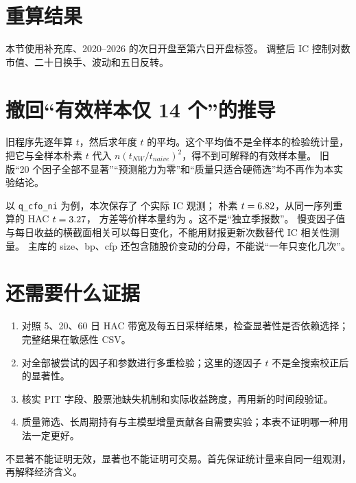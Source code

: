 \section{重算结果}
本节使用补充库、2020--2026 的次日开盘至第六日开盘标签。
调整后 IC 控制对数市值、二十日换手、波动和五日反转。



\section{撤回“有效样本仅 14 个”的推导}
旧程序先逐年算 $t$，然后求年度 $t$ 的平均。这个平均值不是全样本的检验统计量，
把它与全样本朴素 $t$ 代入 $n(t_{NW}/t_{naive})^2$，得不到可解释的有效样本量。
旧版“20 个因子全部不显著”“预测能力为零”和“质量只适合硬筛选”均不再作为本实验结论。

以 \texttt{q\_cfo\_ni} 为例，本次保存了 \AuditQCfoCount{} 个实际 IC 观测；
朴素 $t=6.82$，从同一序列重算的 HAC $t=3.27$，
方差等价样本量约为 \AuditQCfoN{}。这不是“独立季报数”。
慢变因子值与每日收益的横截面相关可以每日变化，不能用财报更新次数替代 IC 相关性测量。
主库的 size、bp、cfp 还包含随股价变动的分母，不能说“一年只变化几次”。

\section{还需要什么证据}
\begin{enumerate}
  \item 对照 5、20、60 日 HAC 带宽及每五日采样结果，检查显著性是否依赖选择；完整结果在敏感性 CSV。
  \item 对全部被尝试的因子和参数进行多重检验；这里的逐因子 $t$ 不是全搜索校正后的显著性。
  \item 核实 PIT 字段、股票池缺失机制和实际收益跨度，再用新的时间段验证。
  \item 质量筛选、长周期持有与主模型增量贡献各自需要实验；本表不证明哪一种用法一定更好。
\end{enumerate}
不显著不能证明无效，显著也不能证明可交易。首先保证统计量来自同一组观测，再解释经济含义。
